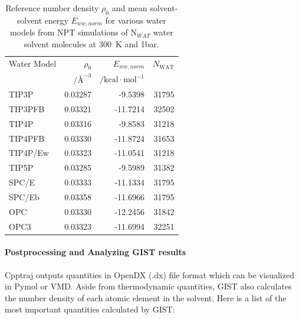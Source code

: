 \documentclass[9pt,tutorial]{livecoms}
\begin{document}
\begin{table}[h]

	\caption{Reference number density $\rho_0$ and mean solvent-solvent energy $E_{ww, norm}$ for various water models from NPT simulations of N$_{WAT}$ water solvent molecules at \SI{300}{\kelvin} and 1bar.}\label{tab:ref_densities}
	\small
	\begin{tabularx}{\columnwidth}{@{}lrrr@{}}
		\toprule
		Water Model       & $\rho_0$ & $E_{ww, norm}$ & $N_\text{WAT}$ \\
        & $/\text{\AA{}}^{-3}$ & $/\text{kcal}\cdot \text{mol}^{-1}$ & \\
		\midrule
		TIP3P \cite{Jorgensen1983-tip3p}    & 0.03287 & -9.5398   & 31795 \\
		TIP3PFB \cite{Wang2014-tip3p-force-balance}  & 0.03321 & -11.7214  & 32502 \\
		TIP4P \cite{Jorgensen1985-tip4p}    & 0.03316 & -9.8583   & 31218 \\
       TIP4PFB \cite{Wang2014-tip3p-force-balance} & 0.03330 & -11.8724   & 31653 \\
		TIP4P/Ew \cite{Horn2004-tip4pew} & 0.03323 & -11.0541  & 31218 \\
		TIP5P \cite{Mahoney2000-tip5p}    & 0.03285 & -9.5989   & 31382 \\
		SPC/E \cite{Berendsen1987-spce}    & 0.03333 & -11.1334  & 31795 \\
       SPC/Eb \cite{Takemura2012-spceb}   & 0.03358 & -11.6966 & 31795 \\
		OPC \cite{Izadi2014-opc}      & 0.03330 & -12.2456 & 31842 \\
		OPC3 \cite{Izadi2016-opc3}     & 0.03323 & -11.6994 & 32251 \\
		\bottomrule
	\end{tabularx}
\end{table}
\pagebreak %
\paragraph{Postprocessing and Analyzing GIST results}
Cpptraj outputs quantities in OpenDX (.dx) file format which can be visualized in Pymol or VMD.
Aside from thermodynamic quantities, GIST also calculates the number density of each atomic element in the solvent.
Here is a list of the most important quantities calculated by GIST:
\end{document}
